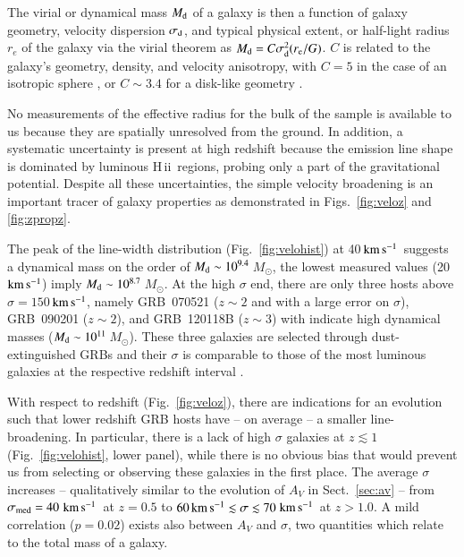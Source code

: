 \documentclass[traditabstract, longauth]{aa}
\newcommand{\kms}{$\rm{km\,s^{-1}}$}
\newcommand{\hii}{\mbox{H\,{\sc ii}}}
\newcommand{\Msun}{$M_\odot$}
\begin{document}
The virial or dynamical mass $M_{\rm{d}}$ of a galaxy is then a function of galaxy geometry, velocity dispersion $\sigma_{\rm{d}}$, and typical physical extent, or half-light radius $r_{e}$ of the galaxy via the virial theorem \citep[see, e.g.,][]{2001ApJ...554..981P} as $M_{\rm{d}} = C\sigma_{\rm{d}}^2(r_{\rm{e}}/G)$. $C$ is related to the galaxy's geometry, density, and velocity anisotropy, with $C=5$ in the case of an isotropic sphere \citep{2001ApJ...554..981P}, or $C\sim3.4$ for a disk-like geometry \citep{2006ApJ...646..107E}.

No measurements of the effective radius for the bulk of the sample is available to us because they are spatially unresolved from the ground.  {In addition, a systematic uncertainty is present at high redshift because the emission line shape is dominated by luminous \hii\, regions, probing only a part of the gravitational potential. Despite all these uncertainties, the simple velocity broadening is an important tracer of galaxy properties as demonstrated in Figs.~\ref{fig:veloz} and \ref{fig:zpropz}.} 

The peak of the line-width distribution (Fig.~\ref{fig:velohist}) at 40\,\kms\, suggests a dynamical mass on the order of $M_{\rm{d}} \sim 10^{9.4}$\,\Msun, the lowest measured values (20\,\kms) imply $M_{\rm{d}} \sim 10^{8.7}$\,\Msun. At the high $\sigma$ end, there are only three hosts above $\sigma=150$\,\kms, namely GRB~070521 ($z\sim2$ and with a large error on $\sigma$), GRB~090201 ($z\sim2$), and GRB~120118B ($z\sim3$) with indicate high dynamical masses ($M_{\rm{d}} \sim 10^{11}$\,\Msun). These three galaxies are selected through dust-extinguished GRBs and their $\sigma$ is comparable to those of the most luminous galaxies at the respective redshift interval \citep[e.g.,][]{2006ApJ...646..107E}.

With respect to redshift (Fig.~\ref{fig:veloz}), there are indications for an evolution such that lower redshift GRB hosts have -- on average -- a smaller line-broadening. In particular, there is a lack of high $\sigma$ galaxies at $z\lesssim1$ (Fig.~\ref{fig:velohist}, lower panel), while there is no obvious bias that would prevent us from selecting or observing these galaxies in the first place. The average $\sigma$ increases -- qualitatively similar to the evolution of $A_V$ in Sect.~\ref{sec:av} -- from $\sigma_{\rm{med}}=40\,$\kms\, at $z=0.5$ to $60\,\rm{km\,s^{-1}}\lesssim \sigma \lesssim 70\,$\kms\, at $z>1.0$. A mild correlation ($p=0.02$) exists also between $A_V$ and $\sigma$, two quantities which relate to the total mass of a galaxy.
 
\end{document}
